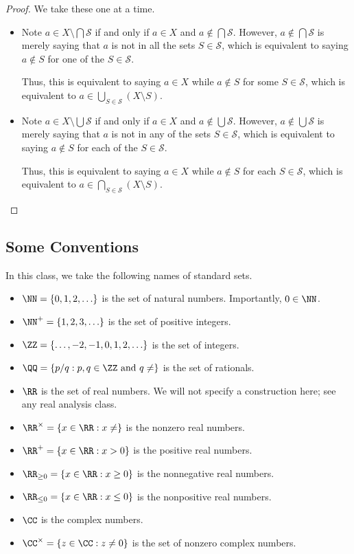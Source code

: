 \documentclass[../notes.tex]{subfiles}
\begin{document}
\begin{proof}
	We take these one at a time.
	\begin{itemize}
		\item Note $a\in X\setminus\bigcap\mathcal S$ if and only if $a\in X$ and $a\notin\bigcap\mathcal S$. However, $a\notin\bigcap\mathcal S$ is merely saying that $a$ is not in all the sets $S\in\mathcal S$, which is equivalent to saying $a\notin S$ for one of the $S\in\mathcal S$.

		Thus, this is equivalent to saying $a\in X$ while $a\notin S$ for some $S\in\mathcal S$, which is equivalent to $a\in\bigcup_{S\in\mathcal S}(X\setminus S)$.
		\item Note $a\in X\setminus\bigcup\mathcal S$ if and only if $a\in X$ and $a\notin\bigcup\mathcal S$. However, $a\notin\bigcup\mathcal S$ is merely saying that $a$ is not in any of the sets $S\in\mathcal S$, which is equivalent to saying $a\notin S$ for each of the $S\in\mathcal S$.

		Thus, this is equivalent to saying $a\in X$ while $a\notin S$ for each $S\in\mathcal S$, which is equivalent to $a\in\bigcap_{S\in\mathcal S}(X\setminus S)$.
		\qedhere
	\end{itemize}
\end{proof}

\subsection{Some Conventions}
In this class, we take the following names of standard sets.
\begin{itemize}
	\item $\NN=\{0,1,2,\ldots\}$ is the set of natural numbers. Importantly, $0\in\NN$.
	\item $\NN^+=\{1,2,3,\ldots\}$ is the set of positive integers.
	\item $\ZZ=\{\ldots,-2,-1,0,1,2,\ldots\}$ is the set of integers.
	\item $\QQ=\{p/q:p,q\in\ZZ\text{ and }q\ne\}$ is the set of rationals.
	\item $\RR$ is the set of real numbers. We will not specify a construction here; see any real analysis class.
	\item $\RR^\times=\{x\in\RR:x\ne\}$ is the nonzero real numbers.
	\item $\RR^+=\{x\in\RR:x>0\}$ is the positive real numbers.
	\item $\RR_{\ge0}=\{x\in\RR:x\ge0\}$ is the nonnegative real numbers.
	\item $\RR_{\le0}=\{x\in\RR:x\le0\}$ is the nonpositive real numbers.
	\item $\CC$ is the complex numbers.
	\item $\CC^\times=\{z\in\CC:z\ne0\}$ is the set of nonzero complex numbers.
\end{itemize}
\end{document}
